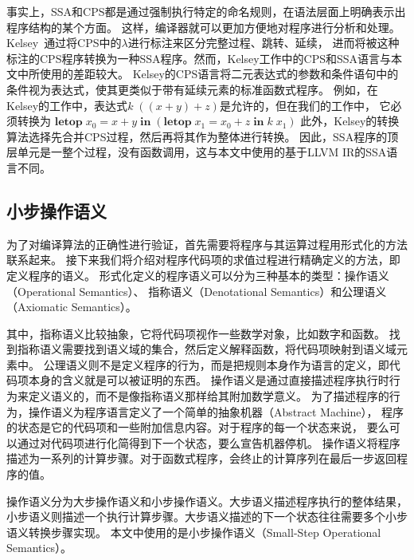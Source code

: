 事实上，SSA和CPS都是通过强制执行特定的命名规则，在语法层面上明确表示出程序结构的某个方面。
这样，编译器就可以更加方便地对程序进行分析和处理。
Kelsey~\cite{kelsey1995correspondence}通过将CPS中的$\lambda$进行标注来区分完整过程、跳转、延续，
进而将被这种标注的CPS程序转换为一种SSA程序。然而，Kelsey工作中的CPS和SSA语言与本文中所使用的差距较大。
Kelsey的CPS语言将二元表达式的参数和条件语句中的条件视为表达式，使其更类似于带有延续元素的标准函数式程序。
例如，在Kelsey的工作中，表达式$k\; ((x+y)+z)$是允许的，但在我们的工作中，
它必须转换为
$\mathbf{letop}\; x_0 = x+y\; \mathbf{in}\; (\mathbf{letop}\; x_1 = x_0+z\; \mathbf{in}\; k\; x_1)$
此外，Kelsey的转换算法选择先合并CPS过程，然后再将其作为整体进行转换。
因此，SSA程序的顶层单元是一整个过程，没有函数调用，这与本文中使用的基于LLVM IR的SSA语言不同。

\subsection{小步操作语义} 

为了对编译算法的正确性进行验证，首先需要将程序与其运算过程用形式化的方法联系起来。
接下来我们将介绍对程序代码项的求值过程进行精确定义的方法，即定义程序的语义。
形式化定义的程序语义可以分为三种基本的类型：操作语义（Operational Semantics）、
指称语义（Denotational Semantics）和公理语义（Axiomatic Semantics）\cite{pierce2002types}。

其中，指称语义比较抽象，它将代码项视作一些数学对象，比如数字和函数。
找到指称语义需要找到语义域的集合，然后定义解释函数，将代码项映射到语义域元素中。
公理语义则不是定义程序的行为，而是把规则本身作为语言的定义，即代码项本身的含义就是可以被证明的东西。
操作语义是通过直接描述程序执行时行为来定义语义的，而不是像指称语义那样给其附加数学意义。
为了描述程序的行为，操作语义为程序语言定义了一个简单的抽象机器（Abstract Machine），
程序的状态是它的代码项和一些附加信息内容。对于程序的每一个状态来说，
要么可以通过对代码项进行化简得到下一个状态，要么宣告机器停机。
操作语义将程序描述为一系列的计算步骤。对于函数式程序，会终止的计算序列在最后一步返回程序的值。

操作语义分为大步操作语义和小步操作语义。大步语义描述程序执行的整体结果，
小步语义则描述一个执行计算步骤。大步语义描述的下一个状态往往需要多个小步语义转换步骤实现。
本文中使用的是小步操作语义（Small-Step Operational Semantics）。

